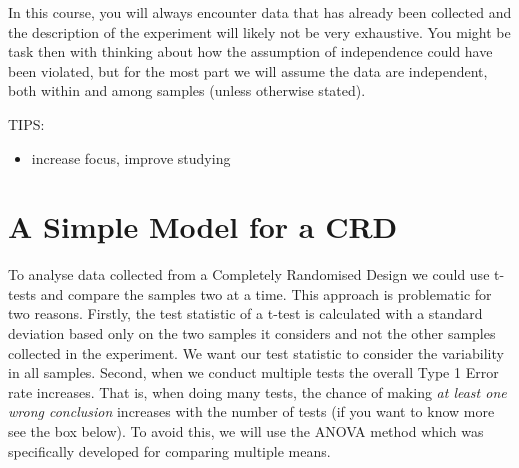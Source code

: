 \documentclass[
  letterpaper,
  DIV=11,
  numbers=noendperiod,
  oneside]{scrreprt}
\providecommand{\tightlist}{%
  \setlength{\itemsep}{0pt}\setlength{\parskip}{0pt}}\usepackage{longtable,booktabs,array}
\begin{document}
\begin{tcolorbox}[enhanced jigsaw, colframe=quarto-callout-tip-color-frame, breakable, arc=.35mm, toptitle=1mm, colback=white, title=\textcolor{quarto-callout-tip-color}{\faLightbulb}\hspace{0.5em}{Note}, opacityback=0, bottomrule=.15mm, opacitybacktitle=0.6, colbacktitle=quarto-callout-tip-color!10!white, toprule=.15mm, rightrule=.15mm, bottomtitle=1mm, leftrule=.75mm, titlerule=0mm, coltitle=black, left=2mm]

In this course, you will always encounter data that has already been
collected and the description of the experiment will likely not be very
exhaustive. You might be task then with thinking about how the
assumption of independence could have been violated, but for the most
part we will assume the data are independent, both within and among
samples (unless otherwise stated).

\end{tcolorbox}

TIPS:

\begin{itemize}
\tightlist
\item
  increase focus, improve studying
\end{itemize}

\chapter{A Simple Model for a CRD}\label{a-simple-model-for-a-crd}

To analyse data collected from a Completely Randomised Design we could
use t-tests and compare the samples two at a time. This approach is
problematic for two reasons. Firstly, the test statistic of a t-test is
calculated with a standard deviation based only on the two samples it
considers and not the other samples collected in the experiment. We want
our test statistic to consider the variability in all samples. Second,
when we conduct multiple tests the overall Type 1 Error rate increases.
That is, when doing many tests, the chance of making \emph{at least one
wrong conclusion} increases with the number of tests (if you want to
know more see the box below). To avoid this, we will use the ANOVA
method which was specifically developed for comparing multiple means.
\end{document}

